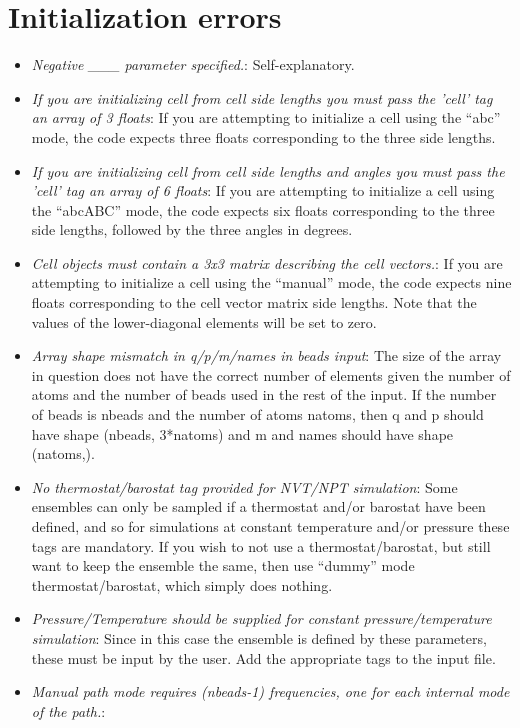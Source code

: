 \documentclass[11pt,english,fleqn]{report}
\begin{document}
\section{Initialization errors}
\begin{itemize}
\item \emph{Negative \_\_\_ parameter specified.}: Self-explanatory.
\item \emph{If you are initializing cell from cell side lengths you must pass the 'cell' tag an array of 3 floats}:
If you are attempting to initialize a cell using the {}``abc'' mode,
the code expects three floats corresponding to the three side lengths. 
\item \emph{If you are initializing cell from cell side lengths and angles you must pass the 'cell' tag an array of 6 floats}:
If you are attempting to initialize a cell using the {}``abcABC''
mode, the code expects six floats corresponding to the three side
lengths, followed by the three angles in degrees.
\item \emph{Cell objects must contain a 3x3 matrix describing the cell vectors.}:
If you are attempting to initialize a cell using the {}``manual''
mode, the code expects nine floats corresponding to the cell vector
matrix side lengths. Note that the values of the lower-diagonal elements
will be set to zero.
\item \emph{Array shape mismatch in q/p/m/names in beads input}: The size
of the array in question does not have the correct number of elements
given the number of atoms and the number of beads used in the rest
of the input. If the number of beads is nbeads and the number of atoms
natoms, then q and p should have shape (nbeads, 3{*}natoms) and m
and names should have shape (natoms,).
\item \emph{No thermostat/barostat tag provided for \emph{NVT}/\emph{NPT} simulation}:
Some ensembles can only be sampled if a thermostat and/or barostat
have been defined, and so for simulations at constant temperature
and/or pressure these tags are mandatory. If you wish to not use a
thermostat/barostat, but still want to keep the ensemble the same,
then use {}``dummy'' mode thermostat/barostat, which simply does
nothing.
\item \emph{Pressure/Temperature should be supplied for constant pressure/temperature simulation}:
Since in this case the ensemble is defined by these parameters, these
must be input by the user. Add the appropriate tags to the input file.
\item \emph{Manual path mode requires (nbeads-1) frequencies, one for each internal mode of the path.}:

\end{itemize}
\end{document}
